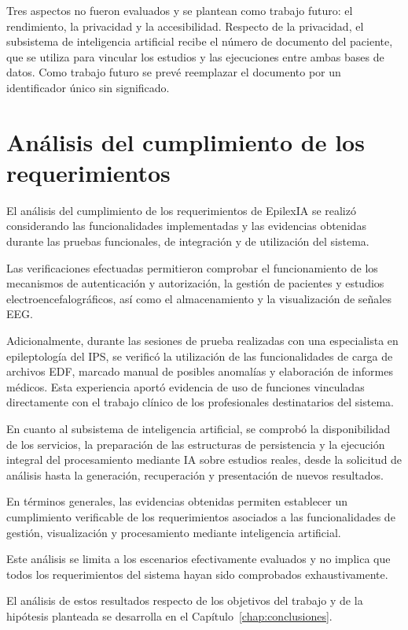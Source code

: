 Tres aspectos no fueron evaluados y se plantean como trabajo futuro: el rendimiento, la privacidad y la accesibilidad.
Respecto de la privacidad, el subsistema de inteligencia artificial recibe el número de documento del paciente, que se utiliza para vincular los estudios y las ejecuciones entre ambas bases de datos.
Como trabajo futuro se prevé reemplazar el documento por un identificador único sin significado.

\section[Análisis del cumplimiento de los requerimientos]{Análisis del cumplimiento de los \\requerimientos}

El análisis del cumplimiento de los requerimientos
de EpilexIA se realizó considerando las
funcionalidades implementadas y las evidencias
obtenidas durante las pruebas funcionales,
de integración y de utilización del sistema.

Las verificaciones efectuadas permitieron
comprobar el funcionamiento de los mecanismos
de autenticación y autorización, la gestión
de pacientes y estudios electroencefalográficos,
así como el almacenamiento y la visualización
de señales EEG.

Adicionalmente, durante las sesiones de prueba
realizadas con una especialista en epileptología
del IPS, se verificó la utilización de las
funcionalidades de carga de archivos EDF,
marcado manual de posibles anomalías y
elaboración de informes médicos. Esta
experiencia aportó evidencia de uso de
funciones vinculadas directamente con el
trabajo clínico de los profesionales
destinatarios del sistema.

En cuanto al subsistema de inteligencia artificial, se comprobó la disponibilidad de los servicios, la preparación de las estructuras de persistencia y la ejecución integral del procesamiento mediante IA sobre estudios reales, desde la solicitud de análisis hasta la generación, recuperación y presentación de nuevos resultados.

En términos generales, las evidencias obtenidas permiten establecer un cumplimiento verificable de los requerimientos asociados a las funcionalidades de gestión, visualización y procesamiento mediante inteligencia artificial.

Este análisis se limita a los escenarios
efectivamente evaluados y no implica que
todos los requerimientos del sistema hayan
sido comprobados exhaustivamente.

\begin{nuevotexto}
El análisis de estos resultados respecto de los objetivos del trabajo y de la hipótesis planteada se desarrolla en el Capítulo~\ref{chap:conclusiones}.
\end{nuevotexto}
